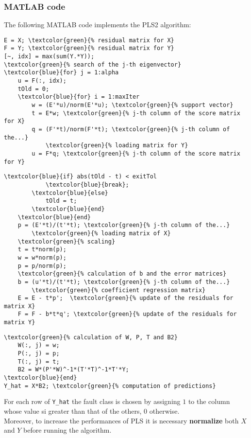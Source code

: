 \begin{frame}[fragile]
	\frametitle{MATLAB code}
	The following MATLAB code implements the PLS2 algorithm:
	\begin{Verbatim}[tabsize=4, commandchars=\\\{\}, frame=topline]
E = X; \textcolor{green}{% residual matrix for X}
F = Y; \textcolor{green}{% residual matrix for Y}
[~, idx] = max(sum(Y.*Y));
\textcolor{green}{% search of the j-th eigenvector}
\textcolor{blue}{for} j = 1:alpha
	u = F(:, idx);
	tOld = 0;
	\textcolor{blue}{for} i = 1:maxIter
		w = (E'*u)/norm(E'*u); \textcolor{green}{% support vector}
		t = E*w; \textcolor{green}{% j-th column of the score matrix for X}
		q = (F'*t)/norm(F'*t); \textcolor{green}{% j-th column of the...}
			\textcolor{green}{% loading matrix for Y}
		u = F*q; \textcolor{green}{% j-th column of the score matrix for Y}
	\end{Verbatim}
\end{frame}

\begin{frame}[fragile]
	\begin{Verbatim}[tabsize=4, commandchars=\\\{\}]
		\textcolor{blue}{if} abs(tOld - t) < exitTol
			\textcolor{blue}{break};
		\textcolor{blue}{else}
			tOld = t;
		\textcolor{blue}{end}
	\textcolor{blue}{end}
	p = (E'*t)/(t'*t); \textcolor{green}{% j-th column of the...}
		\textcolor{green}{% loading matrix of X}
	\textcolor{green}{% scaling}
	t = t*norm(p);
	w = w*norm(p);
	p = p/norm(p);
	\textcolor{green}{% calculation of b and the error matrices}
	b = (u'*t)/(t'*t); \textcolor{green}{% j-th column of the...}
	    \textcolor{green}{% coefficient regression matrix}
	E = E - t*p';  \textcolor{green}{% update of the residuals for matrix X}
	F = F - b*t*q'; \textcolor{green}{% update of the residuals for matrix Y}
	\end{Verbatim}
\end{frame}

\begin{frame}[fragile]
	\begin{Verbatim}[tabsize=4, commandchars=\\\{\}, frame=bottomline]
	\textcolor{green}{% calculation of W, P, T and B2}
	W(:, j) = w;
	P(:, j) = p;
	T(:, j) = t;
	B2 = W*(P'*W)^-1*(T'*T)^-1*T'*Y;
\textcolor{blue}{end}
Y_hat = X*B2; \textcolor{green}{% computation of predictions}
	\end{Verbatim}
For each row of \verb|Y_hat| the fault class is chosen by assigning $1$ to the column whose value si greater than that of the others, $0$ otherwise. \\Moreover, to increase the performances of PLS it is necessary \textbf{normalize} both $X$ and $Y$ before running the algorithm.
\end{frame}
